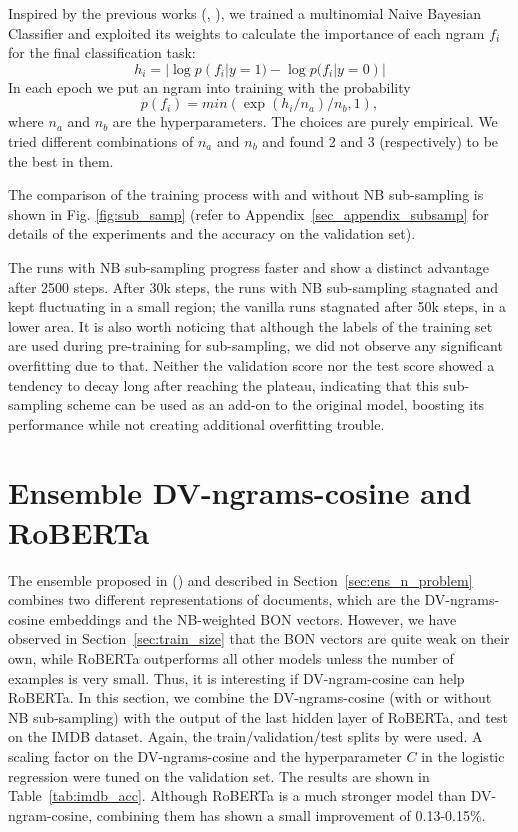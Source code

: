 \documentclass[11pt]{article}
\begin{document}
Inspired by the previous works (\citet{wang-manning-2012-baselines}, \citet{arefyev2021nb-mlm}), we trained a multinomial Naive Bayesian Classifier and exploited its weights to calculate the importance of each ngram $f_i$ for the final classification task:
\begin{equation}
\label{eq:nbw}
h_i = |\log p(f_i|y=1) - \log p(f_i|y=0)|
\end{equation}
In each epoch we put an ngram into training with the probability
\begin{equation}
\label{eq:ss}
    p(f_i) = min(\exp (h_i / n_a) / n_b, 1),
\end{equation}
where $n_a$ and $n_b$ are the hyperparameters. The choices are purely empirical. We tried different combinations of $n_a$ and $n_b$ and found 2 and 3 (respectively) to be the best in them.

The comparison of the training process with and without NB sub-sampling is shown in Fig. \ref{fig:sub_samp} (refer to Appendix~\ref{sec_appendix_subsamp} for details of the experiments and the accuracy on the validation set).

The runs with NB sub-sampling progress faster and show a distinct advantage after 2500 steps. After 30k steps, the runs with NB sub-sampling stagnated and kept fluctuating in a small region; the vanilla runs stagnated after 50k steps, in a lower area. It is also worth noticing that although the labels of the training set are used during pre-training for sub-sampling, we did not observe any significant overfitting due to that. Neither the validation score nor the test score showed a tendency to decay long after reaching the plateau, indicating that this sub-sampling scheme can be used as an add-on to the original model, boosting its performance while not creating additional overfitting trouble.

\section{Ensemble DV-ngrams-cosine and RoBERTa}
The ensemble proposed in (\citet{thongtan-phienthrakul-2019-sentiment}) and described in Section~\ref{sec:ens_n_problem} combines two different representations of documents, which are the DV-ngrams-cosine embeddings and the NB-weighted BON vectors. However, we have observed in Section~\ref{sec:train_size} that the BON vectors are quite weak on their own, while RoBERTa outperforms all other models unless the number of examples is very small. Thus, it is interesting if DV-ngram-cosine can help RoBERTa. 
In this section, we combine the DV-ngrams-cosine (with or without NB sub-sampling) with the output of the last hidden layer of RoBERTa, and test on the IMDB dataset. Again, the train/validation/test splits by \citet{suchin2020} were used. A scaling factor on the DV-ngrams-cosine and the hyperparameter $C$ in the logistic regression were tuned on the validation set.\newline
The results are shown in Table~\ref{tab:imdb_acc}. Although RoBERTa is a much stronger model than DV-ngram-cosine, combining them has shown a small improvement of 0.13-0.15\%.
\end{document}
